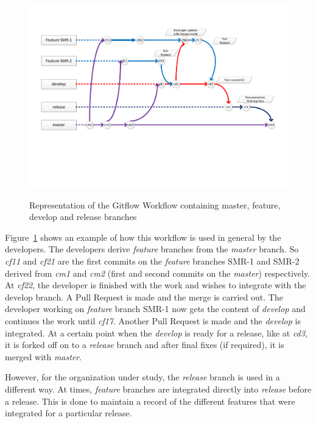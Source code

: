 \documentclass[12pt, a4paper, titlepage]{scrartcl}
\newcommand{\courierword}[1]{\textsf{\itshape #1}}{\fontfamily{pcr}\selectfont}%
\begin{document}
\begin{figure}[!ht]
\caption{Representation of the Gitflow Workflow containing master, feature, develop and release branches}
\includegraphics[clip, trim=0cm 5cm 0cm 0cm, width=\textwidth]{Gitflow-Workflow.pdf}
\label{fig:Gitflow-workflow}
\end{figure}%

\par Figure~\ref{fig:Gitflow-workflow} shows an example of how this workflow is used in general by the developers. The developers derive \courierword{feature} branches from the \courierword{master} branch. So \textit{cf11} and \textit{cf21} are the first commits on the \courierword{feature} branches SMR-1 and SMR-2 derived from \textit{cm1} and \textit{cm2} (first and second commits on the \courierword{master}) respectively. At \textit{cf22}, the developer is finished with the work and wishes to integrate with the develop branch. A Pull Request is made and the merge is carried out. The developer working on \courierword{feature} branch SMR-1 now gets the content of \courierword{develop} and continues the work until \textit{cf17}. Another Pull Request is made and the \courierword{develop} is integrated. At a certain point when the \courierword{develop} is ready for a release, like at \textit{cd3}, it is forked off on to a \courierword{release} branch and after final fixes (if required), it is merged with \courierword{master}. 
\par However, for the organization under study, the \courierword{release} branch is used in a different way. At times, \courierword{feature} branches are integrated directly into \courierword{release} before a release. This is done to maintain a record of the different features that were integrated for a particular release. 
\end{document}
